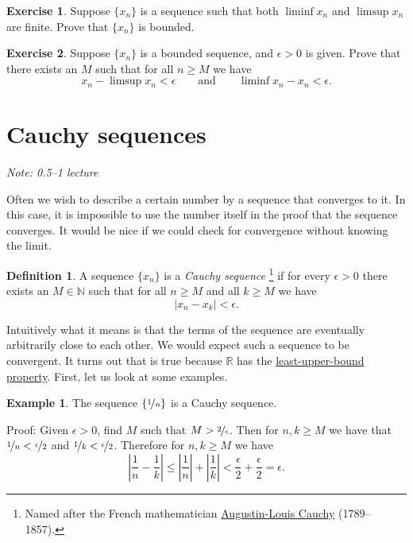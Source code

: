\documentclass[12pt]{book}
\newcommand{\abs}[1]{\left\lvert {#1} \right\rvert}
\newcommand{\R}{{\mathbb{R}}}
\newcommand{\N}{{\mathbb{N}}}
\newcommand{\myindex}[1]{#1\index{#1}}
\newcommand{\sectionnotes}[1]{\noindent \emph{Note: #1} \medskip \par}
\newcommand{\sectionnewpage}{\clearpage}
\theoremstyle{plain}
\theoremstyle{remark}
\theoremstyle{definition}
\newtheorem{defn}[thm]{Definition}
\theoremstyle{exercise}
\newtheorem{exercise}{Exercise}[section]
\theoremstyle{example}
\newtheorem{example}[thm]{Example}
\begin{document}
\begin{exercise}
Suppose $\{ x_n \}$ is a sequence
such that both $\liminf x_n$ and
$\limsup x_n$  are finite.  Prove that $\{ x_n \}$ is bounded.
\end{exercise}

\begin{exercise}
Suppose $\{ x_n \}$ is a bounded sequence, and $\epsilon > 0$ is given.
Prove that there exists an $M$ such that for all $n \geq M$ we have
\begin{equation*}
x_n - \limsup x_n < \epsilon \qquad \text{and} \qquad
\liminf x_n - x_n < \epsilon .
\end{equation*}
\end{exercise}



\sectionnewpage
\section{Cauchy sequences}
\label{sec:cauchy}

\sectionnotes{0.5--1 lecture}

Often we wish to describe a certain number 
by a sequence that converges to it.  In this case, it is impossible to use the
number itself in the proof that the sequence converges.
It would be nice if we could check for convergence without knowing
the limit.

\begin{defn}
A sequence $\{ x_n \}$ is a \emph{\myindex{Cauchy sequence}}%
\footnote{%
Named after the French mathematician
\href{http://en.wikipedia.org/wiki/Cauchy}{Augustin-Louis Cauchy} (1789--1857).} if
for every $\epsilon > 0$ there exists an $M \in \N$ such that
for all $n \geq M$ and all $k \geq M$ we have
\begin{equation*}
\abs{x_n - x_k} < \epsilon .
\end{equation*}
\end{defn}

Intuitively what it means is that the terms of the sequence are eventually
arbitrarily close to each other.  We would expect such a sequence to be
convergent.  It turns out that is true because $\R$ has the
\hyperref[defn:lub]{least-upper-bound property}.  First, let us look at some examples.

\begin{example}
The sequence $\{ \nicefrac{1}{n} \}$ is a Cauchy sequence.

Proof:  Given $\epsilon > 0$, find $M$ such that
$M > \nicefrac{2}{\epsilon}$.  Then for $n,k \geq M$
we have that $\nicefrac{1}{n} < \nicefrac{\epsilon}{2}$
and
$\nicefrac{1}{k} < \nicefrac{\epsilon}{2}$.  Therefore for $n, k \geq M$
we have
\begin{equation*}
\abs{\frac{1}{n} - \frac{1}{k}}
\leq
\abs{\frac{1}{n}} + \abs{\frac{1}{k}}
< \frac{\epsilon}{2} + \frac{\epsilon}{2} = \epsilon.
\end{equation*}
\end{example}
\end{document}
